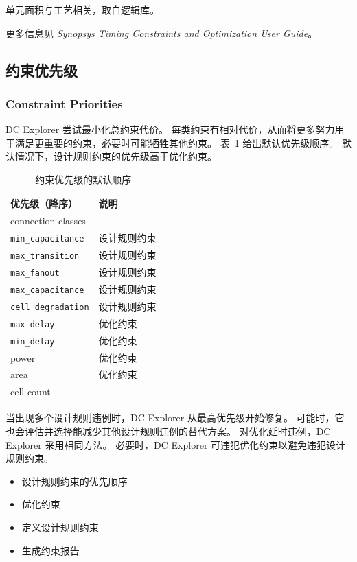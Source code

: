 单元面积与工艺相关，取自逻辑库。

更多信息见 \textit{Synopsys Timing Constraints and Optimization User Guide}。

\subsection{约束优先级}
\subsubsection*{Constraint Priorities}

DC Explorer 尝试最小化总约束代价。
每类约束有相对代价，从而将更多努力用于满足更重要的约束，必要时可能牺牲其他约束。
表~\ref{tab:dce-cons-prio} 给出默认优先级顺序。
默认情况下，设计规则约束的优先级高于优化约束。

\begin{table}[htbp]
\centering
\caption{约束优先级的默认顺序}
\label{tab:dce-cons-prio}
\begin{tabular}{@{}ll@{}}
\toprule
优先级（降序） & 说明 \\
\midrule
connection classes & \\
\texttt{min\_capacitance} & 设计规则约束 \\
\texttt{max\_transition} & 设计规则约束 \\
\texttt{max\_fanout} & 设计规则约束 \\
\texttt{max\_capacitance} & 设计规则约束 \\
\texttt{cell\_degradation} & 设计规则约束 \\
\texttt{max\_delay} & 优化约束 \\
\texttt{min\_delay} & 优化约束 \\
power & 优化约束 \\
area & 优化约束 \\
cell count & \\
\bottomrule
\end{tabular}
\end{table}

当出现多个设计规则违例时，DC Explorer 从最高优先级开始修复。
可能时，它也会评估并选择能减少其他设计规则违例的替代方案。
对优化延时违例，DC Explorer 采用相同方法。
必要时，DC Explorer 可违犯优化约束以避免违犯设计规则约束。

\begin{seeAlsoBox}
\begin{itemize}
  \item 设计规则约束的优先顺序
  \item 优化约束
  \item 定义设计规则约束
  \item 生成约束报告
\end{itemize}
\end{seeAlsoBox}


